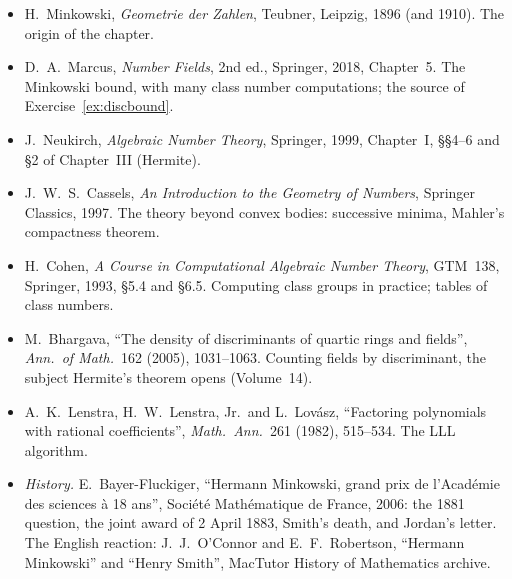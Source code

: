 \begin{itemize}
\item H.~Minkowski, \emph{Geometrie der Zahlen}, Teubner, Leipzig, 1896 (and 1910). The origin of the chapter.
\item D.~A.~Marcus, \emph{Number Fields}, 2nd ed., Springer, 2018, Chapter~5. The Minkowski bound, with many class
number computations; the source of Exercise~\ref{ex:discbound}.
\item J.~Neukirch, \emph{Algebraic Number Theory}, Springer, 1999, Chapter~I, \S\S4--6 and \S2 of Chapter~III (Hermite).
\item J.~W.~S.~Cassels, \emph{An Introduction to the Geometry of Numbers}, Springer Classics, 1997. The theory beyond
convex bodies: successive minima, Mahler's compactness theorem.
\item H.~Cohen, \emph{A Course in Computational Algebraic Number Theory}, GTM~138, Springer, 1993, \S5.4 and \S6.5.
Computing class groups in practice; tables of class numbers.
\item M.~Bhargava, ``The density of discriminants of quartic rings and fields'', \emph{Ann.\ of Math.}\ 162 (2005),
1031--1063. Counting fields by discriminant, the subject Hermite's theorem opens (Volume~14).
\item A.~K.~Lenstra, H.~W.~Lenstra, Jr.\ and L.~Lov\'asz, ``Factoring polynomials with rational coefficients'',
\emph{Math.\ Ann.}\ 261 (1982), 515--534. The LLL algorithm.
\item \emph{History.} E.~Bayer-Fluckiger, ``Hermann Minkowski, grand prix de l'Acad\'emie des sciences \`a 18 ans'',
Soci\'et\'e Math\'ematique de France, 2006: the 1881 question, the joint award of 2 April 1883, Smith's death, and Jordan's
letter. The English reaction: J.~J.~O'Connor and E.~F.~Robertson, ``Hermann Minkowski'' and ``Henry Smith'', MacTutor
History of Mathematics archive.
\end{itemize}
